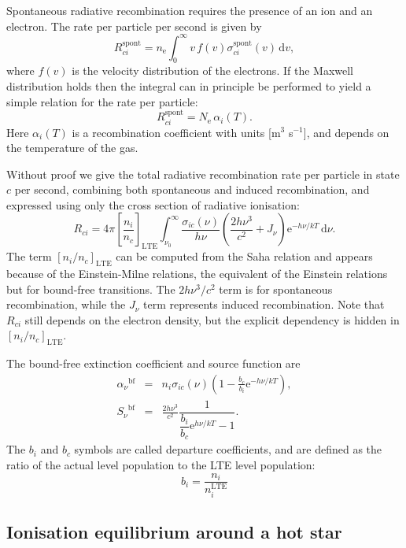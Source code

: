 \documentclass[12pt]{article}
\numberwithin{equation}{section}
\def\exp{\mathrm{e}}
\def\dd{\mathrm{d}}
\def\Jnu{\ensuremath{J_{\nu}}}
\def\Snu{\ensuremath{S_{\nu}}}
\def\anu{\ensuremath{\alpha_{\nu}}}
\def\nelec{\ensuremath{n_\mathrm{e}}}
\newcommand{\be}{\begin{equation}}
\newcommand{\ee}{\end{equation}}
\newcommand{\bea}{\begin{eqnarray}}
\newcommand{\eea}{\end{eqnarray}}
\begin{document}
Spontaneous radiative recombination requires the presence of an ion and an electron. The rate per particle per second is given by
\be
R^\mathrm{spont}_{ci} = \nelec \int_{0}^\infty v \, f(v) \sigma_{ci}^\mathrm{spont}(v) \, \dd v,
\ee
where $f(v)$ is the velocity distribution of the electrons. If the Maxwell distribution holds then the integral can in principle be performed to yield a simple relation for the rate per particle:
\be
R^\mathrm{spont}_{ci} = N_\mathrm{e} \, \alpha_i(T).
\ee
Here $\alpha_i(T)$ is a recombination coefficient with units [m$^3$ s$^{-1}$], and depends on the temperature of the gas.

Without proof we give the total radiative recombination rate per particle in state $c$ per second, combining both spontaneous and induced recombination, and expressed using only the cross section of radiative ionisation:
\be \label{eq:recrate}
R_{ci} = 4 \pi \left[ \frac{n_i}{n_c}\right]_\mathrm{LTE} \int_{\nu_0}^\infty \frac{\sigma_{ic}(\nu)}{h \nu}
\left( \frac{2 h \nu^3}{c^2}+ \Jnu \right) \exp^{-h\nu/kT} \, \dd \nu.
\ee
The term $\left[ n_i/n_c\right]_\mathrm{LTE}$ can be computed from the Saha relation and appears because of the Einstein-Milne relations, the equivalent of the Einstein relations but for bound-free transitions. The $2 h \nu^3/c^2$ term is for spontaneous recombination, while the $\Jnu$ term represents induced recombination. Note that $R_{ci}$ still depends on the electron density, but the explicit dependency is hidden in $\left[ n_i/n_c\right]_\mathrm{LTE}$.

The bound-free extinction coefficient  and source function are 
\bea
\anu^{\mathrm{bf}} &=& n_i \sigma_{ic}(\nu) (1-\frac{b_c}{b_i} \exp^{- h\nu/kT}) \nonumber, \\
\Snu^{\mathrm{bf}} &=& \frac{2h \nu^3}{c^2} \dfrac{1}{\dfrac{b_i}{b_c} \exp^{h\nu/kT}-1}.
\eea
The $b_i$ and $b_c$ symbols are called departure coefficients, and are defined as the ratio of the actual level population to the LTE level population:
\be
b_i = \frac{n_i}{n_i^\mathrm{LTE}}
\ee

\subsection{Ionisation equilibrium around a hot star}
\end{document}
